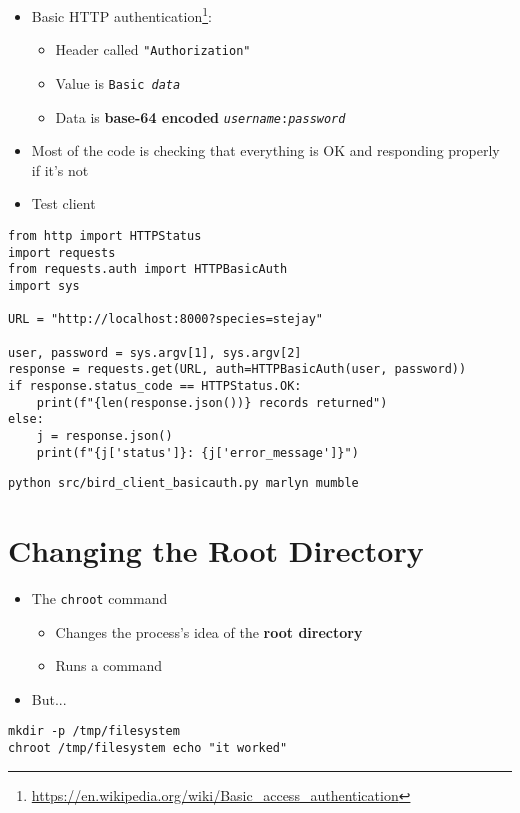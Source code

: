 \documentclass[krantzl]{krantz}
\newcommand{\glossref}[1]{\textbf{#1}}
\newcommand{\hreffoot}[2]{{#1}\footnote{\href{#2}{#2}}}
\begin{document}
\begin{itemize}
\item \hreffoot{Basic HTTP authentication}{https://en.wikipedia.org/wiki/Basic_access_authentication}:\begin{itemize}
\item Header called \texttt{"Authorization"}

\item Value is \texttt{Basic \emph{data}}

\item Data is \glossref{base-64 encoded} \texttt{\emph{username}:\emph{password}}

\end{itemize}


\item Most of the code is checking that everything is OK and responding properly if it’s not

\item Test client

\end{itemize}
\begin{lstlisting}[frame=tblr]
from http import HTTPStatus
import requests
from requests.auth import HTTPBasicAuth
import sys

URL = "http://localhost:8000?species=stejay"

user, password = sys.argv[1], sys.argv[2]
response = requests.get(URL, auth=HTTPBasicAuth(user, password))
if response.status_code == HTTPStatus.OK:
    print(f"{len(response.json())} records returned")
else:
    j = response.json()
    print(f"{j['status']}: {j['error_message']}")
\end{lstlisting}

\begin{lstlisting}[frame=tblr]
python src/bird_client_basicauth.py marlyn mumble
\end{lstlisting}

\section{Changing the Root Directory}
\begin{itemize}
\item The \texttt{chroot} command\begin{itemize}
\item Changes the process’s idea of the \glossref{root directory}

\item Runs a command

\end{itemize}


\item But...

\end{itemize}
\begin{lstlisting}[frame=tblr]
mkdir -p /tmp/filesystem
chroot /tmp/filesystem echo "it worked"
\end{lstlisting}
\end{document}
